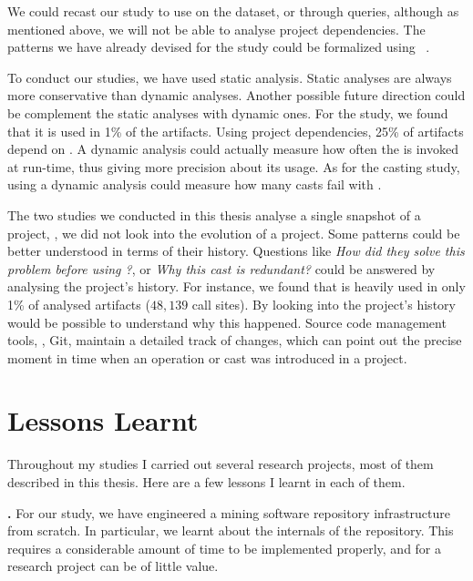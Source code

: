 We could recast our \unsafe{} study to use \boa{} on the \github{} dataset,
or \lgtm{} through \ql{} queries, although as mentioned above,
we will not be able to analyse project dependencies.
The patterns we have already devised for the \unsafe{} study could be formalized using \ql{}~\citep{avgustinovQLObjectorientedQueries2016}.

To conduct our studies, we have used static analysis.
Static analyses are always more conservative than dynamic analyses.
Another possible future direction could be complement the static analyses with dynamic ones.
For the \unsafe{} study,
we found that it is used in 1\% of the \mavencentral{} artifacts.
Using project dependencies, 25\% of artifacts depend on \smu{}.
A dynamic analysis could actually measure how often the \unsafe{} \api{} is invoked at run-time,
thus giving more precision about its usage.
As for the casting study,
using a dynamic analysis could measure how many casts fail with .

The two studies we conducted in this thesis analyse a single snapshot of a project,
\ie{}, we did not look into the evolution of a project.
Some patterns could be better understood in terms of their history.
Questions like
\emph{How did they solve this problem before using \unsafe{}?},
or \emph{Why this cast is redundant?}
could be answered by analysing the project's history. 
For instance,
we found that \smu{} is heavily used in only 1\% of analysed artifacts
($48,139$ call sites).
By looking into the project's history would be possible to understand why this happened.
Source code management tools, \eg{}, Git,
maintain a detailed track of changes,
which can point out the precise moment in time when an \unsafe{} operation or cast was introduced in a project.

\section{Lessons Learnt}

Throughout my \phd{} studies I carried out several research projects,
most of them described in this thesis.
Here are a few lessons I learnt in each of them.

\textbf{\unsafe{} \api{}.}
For our \unsafe{} study,
we have engineered a mining software repository infrastructure from scratch.
In particular,
we learnt about the internals of the \mavencentral{} repository.
This requires a considerable amount of time to be implemented properly,
and for a research project can be of little value.

